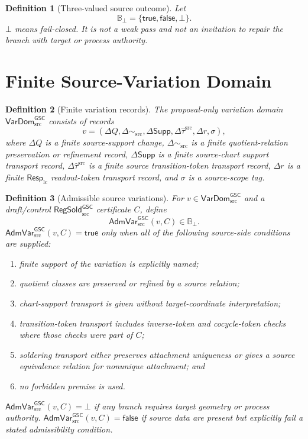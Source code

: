 \documentclass[11pt]{article}
\newcommand{\RespLC}{\mathsf{Resp}_{\mathrm{lc}}}
\newcommand{\RegSold}{\mathsf{RegSold}_{\mathrm{src}}^{\mathsf{GSC}}}
\newcommand{\VarDom}{\mathsf{VarDom}_{\mathrm{src}}^{\mathsf{GSC}}}
\newcommand{\AdmVar}{\mathsf{AdmVar}_{\mathrm{src}}^{\mathsf{GSC}}}
\newcommand{\Tau}{\widehat{\tau}^{\mathrm{src}}}
\newcommand{\Bot}{\bot}
\newtheorem{definition}{Definition}
\begin{document}
\begin{definition}[Three-valued source outcome]
Let
\[
  \mathbb{B}_{\Bot}=\{\mathsf{true},\mathsf{false},\Bot\}.
\]
\(\Bot\) means fail-closed. It is not a weak pass and not an invitation to
repair the branch with target or process authority.
\end{definition}

\section{Finite Source-Variation Domain}

\begin{definition}[Finite variation records]
The proposal-only variation domain \(\VarDom\) consists of records
\[
  v =
  (
    \Delta Q,
    \Delta\!\sim_{\mathrm{src}},
    \Delta\mathsf{Supp},
    \Delta\Tau,
    \Delta r,
    \sigma
  ),
\]
where \(\Delta Q\) is a finite source-support change,
\(\Delta\!\sim_{\mathrm{src}}\) is a finite quotient-relation preservation or
refinement record, \(\Delta\mathsf{Supp}\) is a finite source-chart support
transport record, \(\Delta\Tau\) is a finite source transition-token transport
record, \(\Delta r\) is a finite \(\RespLC\) readout-token transport record,
and \(\sigma\) is a source-scope tag.
\end{definition}

\begin{definition}[Admissible source variations]
For \(v\in\VarDom\) and a draft/control \(\RegSold\) certificate \(C\), define
\[
  \AdmVar(v,C) \in \mathbb{B}_{\Bot}.
\]
\(\AdmVar(v,C)=\mathsf{true}\) only when all of the following source-side
conditions are supplied:
\begin{enumerate}
  \item finite support of the variation is explicitly named;
  \item quotient classes are preserved or refined by a source relation;
  \item chart-support transport is given without target-coordinate
        interpretation;
  \item transition-token transport includes inverse-token and cocycle-token
        checks where those checks were part of \(C\);
  \item soldering transport either preserves attachment uniqueness or gives a
        source equivalence relation for nonunique attachment; and
  \item no forbidden premise is used.
\end{enumerate}
\(\AdmVar(v,C)=\Bot\) if any branch requires target geometry or process
authority. \(\AdmVar(v,C)=\mathsf{false}\) if source data are present but
explicitly fail a stated admissibility condition.
\end{definition}
\end{document}
